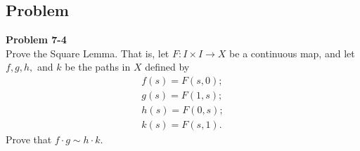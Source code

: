 \documentclass[12pt, a4paper]{article}
\theoremstyle{plain}
\newenvironment{problem}[2][Problem]
    { \begin{mdframed}[backgroundcolor=gray!20] \textbf{#1 #2} \\}
    {  \end{mdframed}}
\begin{document}
\pagebreak

\subsection{Problem}

\begin{problem}{7-4}
    Prove the Square Lemma. That is, let $F\colon I\times I\to X$ be a continuous map, and let $f,g,h,$ and $k$ be the paths in $X$ defined by
    \begin{align*}
        f(s) = F(s,0);\\
        g(s) = F(1,s);\\
        h(s) = F(0,s);\\
        k(s) = F(s,1).
    \end{align*}
    Prove that $f\cdot g\sim h\cdot k$.
\end{problem}
\end{document}
